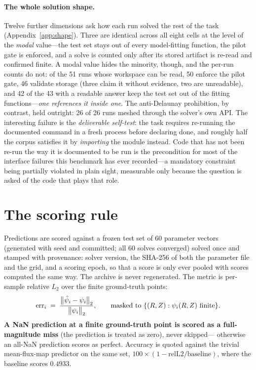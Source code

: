 \paragraph{The whole solution shape.}
Twelve further dimensions ask how each run solved the rest of the task
(Appendix~\ref{app:shape}). Three are identical across all eight cells at the level of the
\emph{modal} value---the test set stays out of every model-fitting function,
the pilot gate is enforced, and a solve is counted only after its stored
artifact is re-read and confirmed finite. A modal value hides the minority,
though, and the per-run counts do not: of the 51 runs whose workspace can be
read, 50 enforce the pilot gate, 46 validate storage (three claim it without
evidence, two are unreadable), and 42 of the 43 with a readable answer keep the
test set out of the fitting functions---\emph{one references it inside one}.
The anti-Delaunay prohibition, by contrast, held outright: 26 of 26 \Lthree{}
runs meshed through the solver's own API. The interesting failure is the \emph{deliverable self-test}: the task
requires re-running the documented  command in a fresh process
before declaring done, and roughly half the corpus satisfies it by
\emph{importing} the module instead. Code that has not been re-run the way it is
documented to be run is the precondition for most of the interface failures this
benchmark has ever recorded---a mandatory constraint being partially violated in
plain sight, measurable only because the question is asked of the code that plays
that role.

\section{The scoring rule}
\label{app:scoring}

Predictions are scored against a frozen test set of 60 parameter vectors
(generated with seed  and committed; all 60 solves converged)
solved once and stamped with provenance: solver version, the SHA-256 of both the
parameter file and the grid, and a scoring epoch, so that a score is only ever
pooled with scores computed the same way. The archive is never regenerated. The
metric is per-sample relative $L_2$ over the finite ground-truth points:
\begin{equation}
  \mathrm{err}_i \;=\;
  \frac{\bigl\lVert \hat{\psi}_i - \psi_i \bigr\rVert_2}
       {\bigl\lVert \psi_i \bigr\rVert_2},
  \qquad
  \text{masked to } \{(R,Z) : \psi_i(R,Z) \text{ finite}\}.
  \label{eq:rell2}
\end{equation}
\textbf{A NaN prediction at a finite ground-truth point is scored as a
full-magnitude miss} (the prediction is treated as zero), never skipped---%
otherwise an all-NaN prediction scores as perfect. Accuracy is quoted against
the trivial mean-flux-map predictor on the same set,
$100 \times (1 - \mathrm{relL2} / \mathrm{baseline})$, where the baseline
scores $0.4933$.

